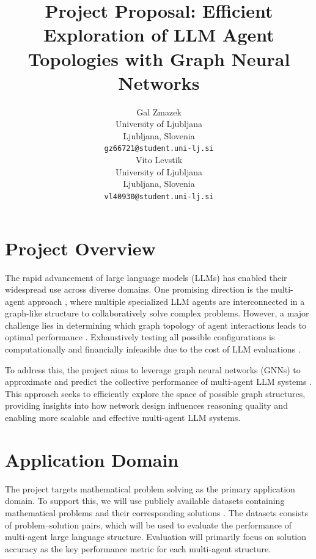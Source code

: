 \documentclass{article}
\title{Project Proposal: Efficient Exploration of LLM Agent Topologies with Graph Neural Networks}
\author{
    Gal Zmazek \\
    University of Ljubljana \\
    Ljubljana, Slovenia \\
    \texttt{gz66721@student.uni-lj.si} \\
    \And
    Vito Levstik \\
    University of Ljubljana \\
    Ljubljana, Slovenia \\
    \texttt{vl40930@student.uni-lj.si} \\
}
\begin{document}
\maketitle


\section{Project Overview}
The rapid advancement of large language models (LLMs) has enabled their widespread use across diverse domains. One promising direction is the multi-agent approach \cite{hendrycks2021measuringmassivemultitasklanguage, yang2025multillmcollaborativesearchcomplex}, where multiple specialized LLM agents are interconnected in a graph-like structure to collaboratively solve complex problems. However, a major challenge lies in determining which graph topology of agent interactions leads to optimal performance \cite{zhou2025multiagentdesignoptimizingagents}. Exhaustively testing all possible configurations is computationally and financially infeasible due to the cost of LLM evaluations \cite{yang2025topologicalstructurelearningresearch}.

To address this, the project aims to leverage graph neural networks (GNNs) to approximate and predict the collective performance of multi-agent LLM systems \cite{zhang2025gdesignerarchitectingmultiagentcommunication}. This approach seeks to efficiently explore the space of possible graph structures, providing insights into how network design influences reasoning quality and enabling more scalable and effective multi-agent LLM systems.

\section{Application Domain}
The project targets mathematical problem solving as the primary application domain. To support this, we will use publicly available datasets containing mathematical problems and their corresponding solutions \cite{amini-etal-2019-mathqa, saxton2019analysingmathematicalreasoningabilities, toshniwal2024openmathinstruct118millionmath}.
The datasets consists of problem–solution pairs, which will be used to evaluate the performance of multi-agent large language structure. Evaluation will primarily focus on solution accuracy as the key performance metric
for each multi-agent structure.

\end{document}
